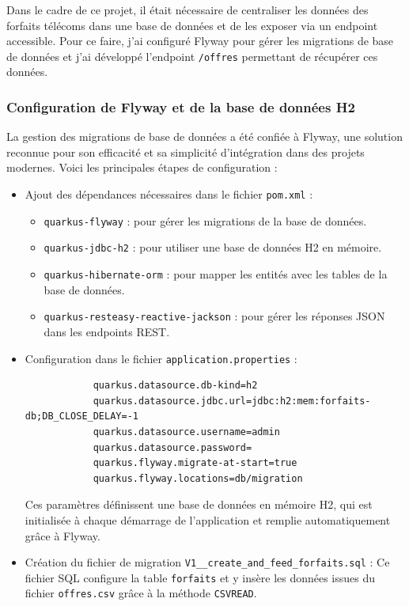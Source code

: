 \documentclass{article}
\begin{document}
	Dans le cadre de ce projet, il était nécessaire de centraliser les données des forfaits télécoms dans une base de données et de les exposer via un endpoint accessible. Pour ce faire, j'ai configuré Flyway pour gérer les migrations de base de données et j'ai développé l'endpoint \texttt{/offres} permettant de récupérer ces données.
	
	\subsubsection{Configuration de Flyway et de la base de données H2}
	
	La gestion des migrations de base de données a été confiée à Flyway, une solution reconnue pour son efficacité et sa simplicité d'intégration dans des projets modernes. Voici les principales étapes de configuration :
	
	\begin{itemize}
		\item Ajout des dépendances nécessaires dans le fichier \texttt{pom.xml} :
		\begin{itemize}
			\item \texttt{quarkus-flyway} : pour gérer les migrations de la base de données.
			\item \texttt{quarkus-jdbc-h2} : pour utiliser une base de données H2 en mémoire.
			\item \texttt{quarkus-hibernate-orm} : pour mapper les entités avec les tables de la base de données.
			\item \texttt{quarkus-resteasy-reactive-jackson} : pour gérer les réponses JSON dans les endpoints REST.
		\end{itemize}
		
		\item Configuration dans le fichier \texttt{application.properties} :
		\begin{verbatim}
			quarkus.datasource.db-kind=h2
			quarkus.datasource.jdbc.url=jdbc:h2:mem:forfaits-db;DB_CLOSE_DELAY=-1
			quarkus.datasource.username=admin
			quarkus.datasource.password=
			quarkus.flyway.migrate-at-start=true
			quarkus.flyway.locations=db/migration
		\end{verbatim}
		
		Ces paramètres définissent une base de données en mémoire H2, qui est initialisée à chaque démarrage de l'application et remplie  automatiquement grâce à Flyway.
		
		\item Création du fichier de migration \texttt{V1\_\_create\_and\_feed\_forfaits.sql} :
		Ce fichier SQL configure la table \texttt{forfaits} et y insère les données issues du fichier \texttt{offres.csv} grâce à la méthode \texttt{CSVREAD}.
	\end{itemize}
	
\end{document}
